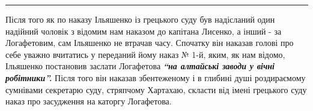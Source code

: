 \documentclass[a4paper,20pt]{report}
\begin{document}

\par\noindent\rule{\textwidth}{0.4pt}

Після того як по наказу Ільяшенко із грецького суду був надісланий один
надійний чоловік з відомим нам наказом до капітана Лисенко, а інший - за
Логафетовим, сам Ільяшенко не втрачав часу. Спочатку він наказав голові про
себе уважно вчитатись у переданий йому наказ № 1-й, яким, як нам відомо,
Ільяшенко постановив заслати Логафетова \textbf{\em ``на алтайські заводи у
вічні робітники''.} Після того він наказав збентеженому і в глибині душі
роздираємому сумнівами секретарю суду, стряпчому Хартахаю, скласти від імені
грецького суду наказ про засудження на каторгу Логафетова.
\end{document}
